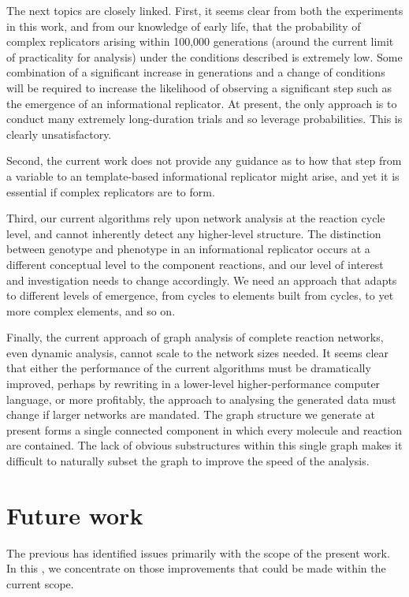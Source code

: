 The next topics are closely linked. First, it seems clear from both the experiments in this work, and from our knowledge of early life, that the probability of complex replicators arising within 100,000 generations (around the current limit of practicality for analysis) under the conditions described is extremely low. Some combination of a significant increase in generations and a change of conditions will be required to increase the likelihood of observing a significant step such as the emergence of an informational replicator. At present, the only approach is to conduct many extremely long-duration trials and so leverage probabilities. This is clearly unsatisfactory.

Second, the current work does not provide any guidance as to how that step from a variable to an template-based informational replicator might arise, and yet it is essential if complex replicators are to form. 

Third, our current algorithms rely upon network analysis at the reaction cycle level, and cannot inherently detect any higher-level structure. The distinction between genotype and phenotype in an informational replicator occurs at a different conceptual level to the component reactions, and our level of interest and investigation needs to change accordingly. We need an approach that adapts to different levels of emergence, from cycles to elements built from cycles, to yet more complex elements, and so on. 

Finally, the current approach of graph analysis of complete reaction networks, even dynamic analysis, cannot scale to the network sizes needed. It seems clear that either the performance of the current algorithms must be dramatically improved, perhaps by rewriting in a lower-level higher-performance computer language, or more profitably, the approach to analysing the generated data must change if larger networks are mandated. The graph structure we generate at present forms a single connected component in which every molecule and reaction are contained. The lack of obvious substructures within this single graph makes it difficult to naturally subset the graph to improve the speed of the analysis.

\section{Future work}\label{sec:future-work}

The previous  has identified issues primarily with the scope of the present work. In this , we concentrate on those improvements that could be made within the current scope. 

